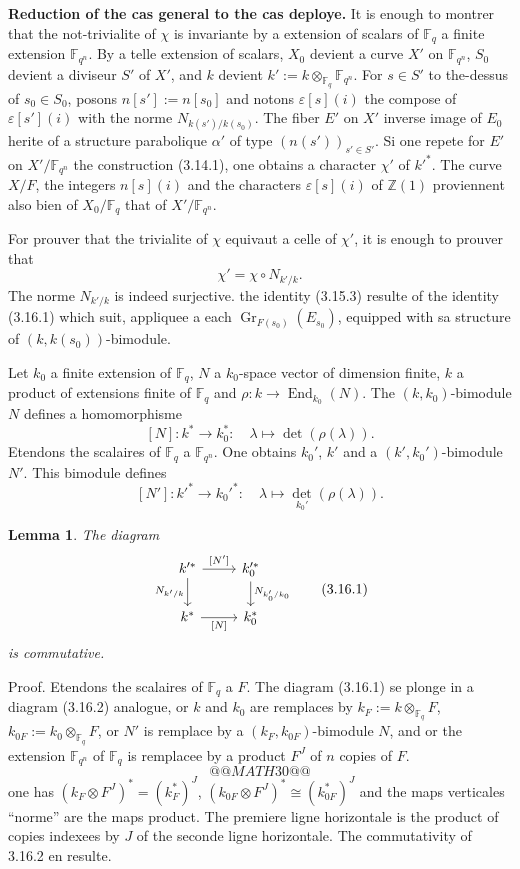 \documentclass[11pt,a4paper]{article}
\theoremstyle{plain}
\newtheorem{lemma}[theorem]{Lemma}
\theoremstyle{definition}
\DeclareMathOperator{\End}{End}
\DeclareMathOperator{\Gri}{Gr}
\newcommand{\Z}{\mathbb{Z}}
\newcommand{\F}{\mathbb{F}}
\begin{document}
\textbf{Reduction of the cas general to the cas deploye.} It is enough to montrer that the not-trivialite of $\chi$ is invariante by a extension of scalars of $\F_q$ a finite extension $\F_{q^n}$. By a telle extension of scalars, $X_0$ devient a curve $X'$ on $\F_{q^n}$, $S_0$ devient a diviseur $S'$ of $X'$, and $k$ devient $k' := k \otimes_{\F_q} \F_{q^n}$. For $s \in S'$ to the-dessus of $s_0 \in S_0$, posons $n[s'] := n[s_0]$ and notons $\varepsilon[s](i)$ the compose of $\varepsilon[s'](i)$ with the norme $N_{k(s')/k(s_0)}$. The fiber $E'$ on $X'$ inverse image of $E_0$ herite of a structure parabolique $\alpha'$ of type $(n(s'))_{s' \in S'}$. Si one repete for $E'$ on $X'/\F_{q^n}$ the construction (3.14.1), one obtains a character $\chi'$ of $k'^*$. The curve $X/F$, the integers $n[s](i)$ and the characters $\varepsilon[s](i)$ of $\Z(1)$ proviennent also bien of $X_0/\F_q$ that of $X'/\F_{q^n}$.

For prouver that the trivialite of $\chi$ equivaut a celle of $\chi'$, it is enough to prouver that
\begin{equation}
\chi' = \chi \circ N_{k'/k}.
\tag{3.15.3}
\end{equation}
The norme $N_{k'/k}$ is indeed surjective. the identity (3.15.3) resulte of the identity (3.16.1) which suit, appliquee a each $\Gri_{F(s_0)}(E_{s_0})$, equipped with sa structure of $(k, k(s_0))$-bimodule.

Let $k_0$ a finite extension of $\F_q$, $N$ a $k_0$-space vector of dimension finite, $k$ a product of extensions finite of $\F_q$ and $\rho: k \to \End_{k_0}(N)$. The $(k, k_0)$-bimodule $N$ defines a homomorphisme
\[
[N]: k^* \longrightarrow k_0^*: \quad \lambda \mapsto \det(\rho(\lambda)).
\]
Etendons the scalaires of $\F_q$ a $\F_{q^n}$. One obtains $k_0'$, $k'$ and a $(k', k_0')$-bimodule $N'$. This bimodule defines
\[
[N']: k'^* \longrightarrow k_0'^*: \quad \lambda \mapsto \det_{k_0'}(\rho(\lambda)).
\]

\begin{lemma}
The diagram
\begin{equation}
\begin{tikzcd}
k'^* \arrow[r, "{[N']}"] \arrow[d, "N_{k'/k}"'] & k_0'^* \arrow[d, "N_{k_0'/k_0}"] \\
k^* \arrow[r, "{[N]}"'] & k_0^*
\end{tikzcd}
\tag{3.16.1}
\end{equation}
is commutative.
\end{lemma}

Proof. Etendons the scalaires of $\F_q$ a $F$. The diagram (3.16.1) se plonge in a diagram (3.16.2) analogue, or $k$ and $k_0$ are remplaces by $k_F := k \otimes_{\F_q} F$, $k_{0F} := k_0 \otimes_{\F_q} F$, or $N'$ is remplace by a $(k_F, k_{0F})$-bimodule $N$, and or the extension $\F_{q^n}$ of $\F_q$ is remplacee by a product $F^J$ of $n$ copies of $F$.
\[
@@MATH30@@
\tag{3.16.2}
\]
one has $(k_F \otimes F^J)^* = (k_F^*)^J$, $(k_{0F} \otimes F^J)^* \cong (k_{0F}^*)^J$ and the maps verticales ``norme'' are the maps product. The premiere ligne horizontale is the product of copies indexees by $J$ of the seconde ligne horizontale. The commutativity of 3.16.2 en resulte.
\end{document}
